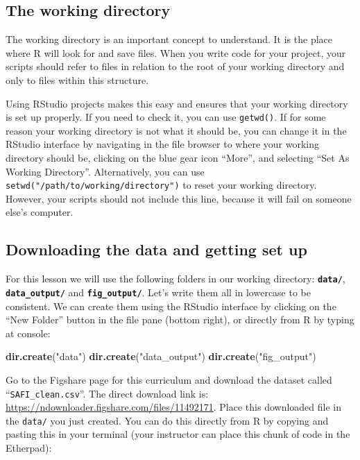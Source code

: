\documentclass[]{book}
\newenvironment{Shaded}{\begin{snugshade}}{\end{snugshade}}
\newcommand{\KeywordTok}[1]{\textcolor[rgb]{0.13,0.29,0.53}{\textbf{#1}}}
\newcommand{\StringTok}[1]{\textcolor[rgb]{0.31,0.60,0.02}{#1}}
\newcommand{\NormalTok}[1]{#1}
\begin{document}
\subsection{The working directory}\label{the-working-directory}

The working directory is an important concept to understand. It is the
place where R will look for and save files. When you write code for your
project, your scripts should refer to files in relation to the root of
your working directory and only to files within this structure.

Using RStudio projects makes this easy and ensures that your working
directory is set up properly. If you need to check it, you can use
\texttt{getwd()}. If for some reason your working directory is not what
it should be, you can change it in the RStudio interface by navigating
in the file browser to where your working directory should be, clicking
on the blue gear icon ``More'', and selecting ``Set As Working
Directory''. Alternatively, you can use
\texttt{setwd("/path/to/working/directory")} to reset your working
directory. However, your scripts should not include this line, because
it will fail on someone else's computer.

\subsection{Downloading the data and getting set
up}\label{downloading-the-data-and-getting-set-up}

For this lesson we will use the following folders in our working
directory: \textbf{\texttt{data/}}, \textbf{\texttt{data\_output/}} and
\textbf{\texttt{fig\_output/}}. Let's write them all in lowercase to be
consistent. We can create them using the RStudio interface by clicking
on the ``New Folder'' button in the file pane (bottom right), or
directly from R by typing at console:

\begin{Shaded}
\begin{Highlighting}[]
\KeywordTok{dir.create}\NormalTok{(}\StringTok{"data"}\NormalTok{)}
\KeywordTok{dir.create}\NormalTok{(}\StringTok{"data_output"}\NormalTok{)}
\KeywordTok{dir.create}\NormalTok{(}\StringTok{"fig_output"}\NormalTok{)}
\end{Highlighting}
\end{Shaded}

Go to the Figshare page for this curriculum and download the dataset
called ``\texttt{SAFI\_clean.csv}''. The direct download link is:
\url{https://ndownloader.figshare.com/files/11492171}. Place this
downloaded file in the \texttt{data/} you just created. You can do this
directly from R by copying and pasting this in your terminal (your
instructor can place this chunk of code in the Etherpad):
\end{document}

